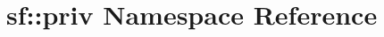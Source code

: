 \hypertarget{namespacesf_1_1priv}{\section{sf\-:\-:priv Namespace Reference}
\label{namespacesf_1_1priv}
}
